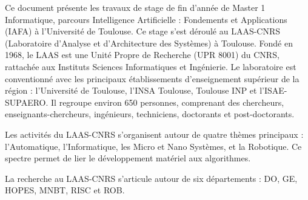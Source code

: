 
Ce document présente les travaux de stage de fin d'année de Master 1 Informatique, parcours Intelligence Artificielle : Fondements et Applications (IAFA) à l'Université de Toulouse. Ce stage s'est déroulé au LAAS-CNRS (Laboratoire d'Analyse et d'Architecture des Systèmes) à Toulouse. Fondé en 1968, le LAAS est une Unité Propre de Recherche (UPR 8001) du CNRS, rattachée aux Instituts Sciences Informatiques et Ingénierie. Le laboratoire est conventionné avec les principaux établissements d'enseignement supérieur de la région : l'Université de Toulouse, l'INSA Toulouse, Toulouse INP et l'ISAE-SUPAERO. Il regroupe environ 650 personnes, comprenant des chercheurs, enseignants-chercheurs, ingénieurs, techniciens, doctorants et post-doctorants.

\bigskip
Les activités du LAAS-CNRS s'organisent autour de quatre thèmes principaux : l'Automatique, l'Informatique, les Micro et Nano Systèmes, et la Robotique. Ce spectre permet de lier le développement matériel aux algorithmes.

\bigskip
La recherche au LAAS-CNRS s'articule autour de six départements : DO, GE, HOPES, MNBT, RISC et ROB.

